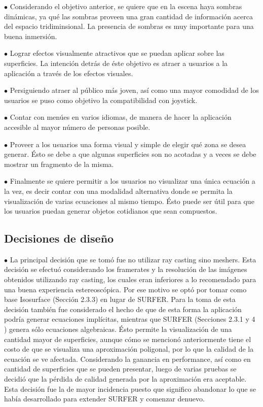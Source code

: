 \documentclass[12pt]{article}
\begin{document}
$\bullet$ Considerando el objetivo anterior, se quiere que en la escena haya sombras dinámicas, ya qué las sombras proveen una gran cantidad de información acerca del espacio tridiminsional. La presencia de sombras es muy importante para una buena inmersión.

$\bullet$ Lograr efectos visualmente atractivos que se puedan aplicar sobre las superficies. La intención detrás de éste objetivo es atraer a usuarios a la aplicación a través de los efectos visuales.

$\bullet$ Persiguiendo atraer al público más joven, así como una mayor comodidad de los usuarios se puso como objetivo la compatibilidad con joystick.

$\bullet$ Contar con menúes en varios idiomas, de manera de hacer la aplicación accesible al mayor número de personas posible.

$\bullet$  Proveer a los usuarios una forma visual y simple de elegir qué zona se desea generar. Ésto se debe a que algunas superficies son no acotadas y a veces se debe mostrar un fragmento de la misma.

$\bullet$ Finalmente se quiere permitir a los usuarios no visualizar una única ecuación a la vez, es decir contar con una modalidad alternativa donde se permita la visualización de varias ecuaciones al mismo tiempo. Ésto puede ser útil para que los usuarios puedan generar objetos cotidianos que sean compuestos.

\subsection{Decisiones de diseño}

$\bullet$ La principal decisión que se tomó fue no utilizar ray casting sino meshers. Esta decisión se efectuó considerando los framerates y la resolución de las imágenes obtenidos utilizando ray casting, los cuales eran inferiores a lo recomendado para una buena experiencia estereoscópica. Por ese motivo se optó por tomar como base Isosurface (Sección 2.3.3) en lugar de SURFER. Para la toma de esta decisión también fue considerado el hecho de que de esta forma la aplicación podría generar ecuaciones implícitas, mientras que SURFER (Secciones 2.3.1 y 4 ) genera sólo ecuaciones algebraicas. Ésto permite la visualización de una cantidad mayor de superficies, aunque cómo se mencionó anteriormente tiene el costo de que se visualiza una aproximación poligonal, por lo que la calidad de la ecuación se ve afectada. Considerando la ganancia en performance, así como en cantidad de superficies que se pueden presentar, luego de varias pruebas se decidió que la pérdida de calidad generada por la aproximación era aceptable. Esta decisión fue la de mayor incidencia puesto que significo abandonar lo que se había desarrollado para extender SURFER y comenzar denuevo.
\end{document}
